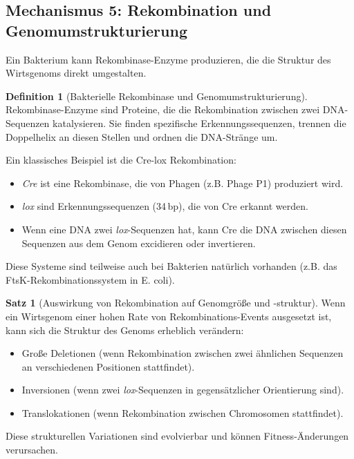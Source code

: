 \documentclass[a4paper,12pt]{article}
\theoremstyle{definition}
\newtheorem{definition}{Definition}
\newtheorem{satz}{Satz}
\begin{document}
\subsection{Mechanismus 5: Rekombination und Genomumstrukturierung}

Ein Bakterium kann Rekombinase-Enzyme produzieren, die die Struktur des Wirtsgenoms direkt umgestalten.

\begin{definition}[Bakterielle Rekombinase und Genomumstrukturierung]
Rekombinase-Enzyme sind Proteine, die die Rekombination zwischen zwei DNA-Sequenzen katalysieren. Sie finden spezifische Erkennungssequenzen, trennen die Doppelhelix an diesen Stellen und ordnen die DNA-Stränge um.

Ein klassisches Beispiel ist die Cre-lox Rekombination:
\begin{itemize}
    \item[-] \textit{Cre} ist eine Rekombinase, die von Phagen (z.B. Phage P1) produziert wird.
    \item[-] \textit{lox} sind Erkennungssequenzen (34\,bp), die von Cre erkannt werden.
    \item[-] Wenn eine DNA zwei \textit{lox}-Sequenzen hat, kann Cre die DNA zwischen diesen Sequenzen aus dem Genom excidieren oder invertieren.
\end{itemize}

Diese Systeme sind teilweise auch bei Bakterien natürlich vorhanden (z.B. das FtsK-Rekombinationssystem in E. coli).
\end{definition}

\begin{satz}[Auswirkung von Rekombination auf Genomgröße und -struktur]
Wenn ein Wirtsgenom einer hohen Rate von Rekombinations-Events ausgesetzt ist, kann sich die Struktur des Genoms erheblich verändern:
\begin{itemize}
    \item[-] Große Deletionen (wenn Rekombination zwischen zwei ähnlichen Sequenzen an verschiedenen Positionen stattfindet).
    \item[-] Inversionen (wenn zwei \textit{lox}-Sequenzen in gegensätzlicher Orientierung sind).
    \item[-] Translokationen (wenn Rekombination zwischen Chromosomen stattfindet).
\end{itemize}

Diese strukturellen Variationen sind evolvierbar und können Fitness-Änderungen verursachen.
\end{satz}
\end{document}
